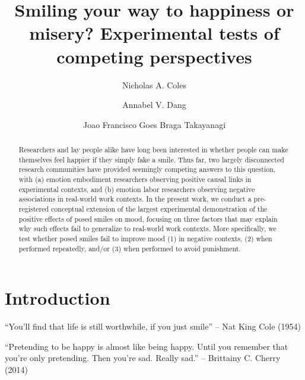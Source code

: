 \documentclass[
  letterpaper,
  DIV=11,
  numbers=noendperiod]{scrartcl}
\title{Smiling your way to happiness or misery? Experimental tests of
competing perspectives}
\author{Nicholas A. Coles \and Annabel V. Dang \and Joao Francisco Goes
Braga Takayanagi}
\date{}
\begin{document}
\maketitle
\begin{abstract}
Researchers and lay people alike have long been interested in whether
people can make themselves feel happier if they simply fake a smile.
Thus far, two largely disconnected research communities have provided
seemingly competing answers to this question, with (a) emotion
embodiment researchers observing positive causal links in experimental
contexts, and (b) emotion labor researchers observing negative
associations in real-world work contexts. In the present work, we
conduct a pre-registered conceptual extension of the largest
experimental demonstration of the positive effects of posed smiles on
mood, focusing on three factors that may explain why such effects fail
to generalize to real-world work contexts. More specifically, we test
whether posed smiles fail to improve mood (1) in negative contexts, (2)
when performed repeatedly, and/or (3) when performed to avoid
punishment.
\end{abstract}


\section{Introduction}\label{introduction}

``You'll find that life is still worthwhile, if you just smile'' -- Nat
King Cole (1954)

``Pretending to be happy is almost like being happy. Until you remember
that you're only pretending. Then you're sad. Really sad.'' -- Brittainy
C. Cherry (2014)
\end{document}
